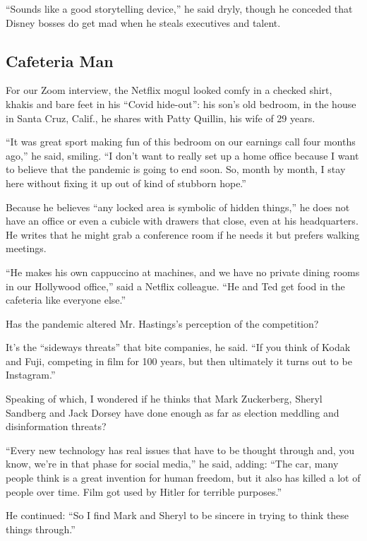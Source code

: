 ``Sounds like a good storytelling device,'' he said dryly, though he
conceded that Disney bosses do get mad when he steals executives and
talent.

\hypertarget{cafeteria-man}{%
\subsection{Cafeteria Man}\label{cafeteria-man}}

For our Zoom interview, the Netflix mogul looked comfy in a checked
shirt, khakis and bare feet in his ``Covid hide-out'': his son's old
bedroom, in the house in Santa Cruz, Calif., he shares with Patty
Quillin, his wife of 29 years.

``It was great sport making fun of this bedroom on our earnings call
four months ago,'' he said, smiling. ``I don't want to really set up a
home office because I want to believe that the pandemic is going to end
soon. So, month by month, I stay here without fixing it up out of kind
of stubborn hope.''

Because he believes ``any locked area is symbolic of hidden things,'' he
does not have an office or even a cubicle with drawers that close, even
at his headquarters. He writes that he might grab a conference room if
he needs it but prefers walking meetings.

``He makes his own cappuccino at machines, and we have no private dining
rooms in our Hollywood office,'' said a Netflix colleague. ``He and Ted
get food in the cafeteria like everyone else.''

Has the pandemic altered Mr. Hastings's perception of the competition?

It's the ``sideways threats'' that bite companies, he said. ``If you
think of Kodak and Fuji, competing in film for 100 years, but then
ultimately it turns out to be Instagram.''

Speaking of which, I wondered if he thinks that Mark Zuckerberg, Sheryl
Sandberg and Jack Dorsey have done enough as far as election meddling
and disinformation threats?

``Every new technology has real issues that have to be thought through
and, you know, we're in that phase for social media,'' he said, adding:
``The car, many people think is a great invention for human freedom, but
it also has killed a lot of people over time. Film got used by Hitler
for terrible purposes.''

He continued: ``So I find Mark and Sheryl to be sincere in trying to
think these things through.''

